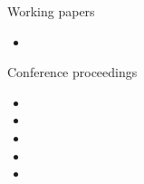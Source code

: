 \documentclass{resume}
\begin{document}
\begin{rSection}{Working papers}
\begin{itemize}
  \item {}
\end{itemize}
\end{rSection}


\newpage

\begin{rSection}{Conference proceedings}
\begin{itemize}
\item {}
\item {}
\item {}
\item {}
\item {}
\end{itemize}

\end{rSection}

\end{document}
